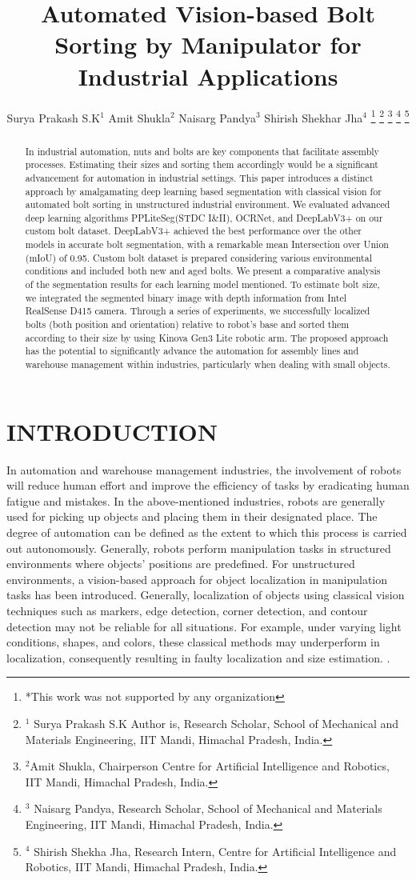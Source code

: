 \documentclass[letterpaper, 10 pt, conference]{ieeeconf}  %
\title{\LARGE \bf Automated Vision-based Bolt Sorting by Manipulator for Industrial Applications}
\author{Surya Prakash S.K$^{1}$ Amit Shukla$^{2} $  Naisarg Pandya$^{3}$ Shirish Shekhar Jha$^{4}$%
\thanks{*This work was not supported by any organization}%
\thanks{$^{1}$ Surya Prakash S.K Author is, Research Scholar, School of Mechanical and Materials Engineering, IIT Mandi, Himachal Pradesh, India.}%
\thanks{$^{2}$Amit Shukla, Chairperson Centre for Artificial Intelligence and Robotics, IIT Mandi, Himachal Pradesh, India.}
\thanks{$^{3}$ Naisarg Pandya, Research Scholar, School of Mechanical and Materials Engineering, IIT Mandi, Himachal Pradesh, India.}
\thanks{$^{4}$ Shirish Shekha Jha, Research Intern, Centre for Artificial Intelligence and Robotics, IIT Mandi, Himachal Pradesh, India.}
}
\begin{document}
\maketitle
\thispagestyle{empty}
\pagestyle{empty}


\begin{abstract}
In industrial automation, nuts and bolts are key components that facilitate assembly processes. Estimating their sizes and sorting them accordingly would be a significant advancement for automation in industrial settings. This paper introduces a distinct approach by amalgamating deep learning based segmentation with classical vision for automated bolt sorting in unstructured industrial environment. We evaluated advanced deep learning algorithms PPLiteSeg(STDC I\&II), OCRNet, and DeepLabV3+ on our custom bolt dataset. DeepLabV3+ achieved the best performance over the other models in accurate bolt segmentation, with a remarkable mean Intersection over Union (mIoU) of 0.95. Custom bolt dataset is prepared considering various environmental conditions and included both new and aged bolts. We present a comparative analysis of the segmentation results for each learning model mentioned. To estimate bolt size, we integrated the segmented binary image with depth information from Intel RealSense D415 camera. Through a series of experiments, we successfully localized bolts (both position and orientation) relative to robot’s base and sorted them according to their size by using Kinova Gen3 Lite robotic arm. The proposed approach has the potential to significantly advance the automation for assembly lines and warehouse management within industries, particularly when dealing with small objects.
\end{abstract}


\section{INTRODUCTION}
In automation and warehouse management industries, the involvement of robots will reduce human effort and improve the efficiency of tasks by eradicating human fatigue and mistakes. In the above-mentioned industries, robots are generally used for picking up objects and placing them in their designated place. The degree of automation can be defined as the extent to which this process is carried out autonomously. Generally, robots perform manipulation tasks in structured environments where objects' positions are predefined. For unstructured environments, a vision-based approach for object localization in manipulation tasks has been introduced. Generally, localization of objects using classical vision techniques such as markers, edge detection, corner detection, and contour detection may not be reliable for all situations. For example, under varying light conditions, shapes, and colors, these classical methods may underperform in localization, consequently resulting in faulty localization and size estimation. \cite{DeepLearningvsClassicalVision}.
\end{document}
